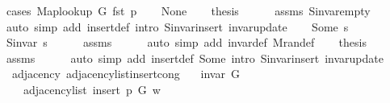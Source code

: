 \begin{isabellebody}
%
\isadelimproof
%
\endisadelimproof
%
\isatagproof
{}\isamarkupfalse%
\ {\isacharparenleft}{\kern0pt}cases\ {\isachardoublequoteopen}Map{\isacharunderscore}{\kern0pt}lookup\ G\ {\isacharparenleft}{\kern0pt}fst\ p{\isacharparenright}{\kern0pt}{\isachardoublequoteclose}{\isacharparenright}{\kern0pt}\isanewline
\ \ \isamarkupfalse%
\ None\isanewline
\ \ \isamarkupfalse%
\ {\isacharquery}{\kern0pt}thesis\isanewline
\ \ \ \ \isamarkupfalse%
\ assms\ S{\isachardot}{\kern0pt}invar{\isacharunderscore}{\kern0pt}empty\isanewline
\ \ \ \ \isamarkupfalse%
\ {\isacharparenleft}{\kern0pt}auto\ simp\ add{\isacharcolon}{\kern0pt}\ insert{\isacharunderscore}{\kern0pt}def\ intro{\isacharcolon}{\kern0pt}\ S{\isachardot}{\kern0pt}invar{\isacharunderscore}{\kern0pt}insert\ invar{\isacharunderscore}{\kern0pt}update{\isacharparenright}{\kern0pt}\isanewline
{}\isamarkupfalse%
\isanewline
\ \ \isamarkupfalse%
\ {\isacharparenleft}{\kern0pt}Some\ s{\isacharparenright}{\kern0pt}\isanewline
\ \ \isamarkupfalse%
\ {\isachardoublequoteopen}S{\isachardot}{\kern0pt}invar\ s{\isachardoublequoteclose}\isanewline
\ \ \ \ \isamarkupfalse%
\ assms\isanewline
\ \ \ \ \isamarkupfalse%
\ {\isacharparenleft}{\kern0pt}auto\ simp\ add{\isacharcolon}{\kern0pt}\ invar{\isacharunderscore}{\kern0pt}def\ M{\isachardot}{\kern0pt}ran{\isacharunderscore}{\kern0pt}def{\isacharparenright}{\kern0pt}\isanewline
\ \ \isamarkupfalse%
\ {\isacharquery}{\kern0pt}thesis\isanewline
\ \ \ \ \isamarkupfalse%
\ assms\isanewline
\ \ \ \ \isamarkupfalse%
\ {\isacharparenleft}{\kern0pt}auto\ simp\ add{\isacharcolon}{\kern0pt}\ insert{\isacharunderscore}{\kern0pt}def\ Some\ intro{\isacharcolon}{\kern0pt}\ S{\isachardot}{\kern0pt}invar{\isacharunderscore}{\kern0pt}insert\ invar{\isacharunderscore}{\kern0pt}update{\isacharparenright}{\kern0pt}\isanewline
{}\isamarkupfalse%
%
\endisatagproof
{\isafoldproof}%
%
\isadelimproof
\isanewline
%
\endisadelimproof
\isanewline
{}\isamarkupfalse%
\ {\isacharparenleft}{\kern0pt}\ adjacency{\isacharparenright}{\kern0pt}\ adjacency{\isacharunderscore}{\kern0pt}list{\isacharunderscore}{\kern0pt}insert{\isacharunderscore}{\kern0pt}cong{\isacharcolon}{\kern0pt}\isanewline
\ \ \ {\isachardoublequoteopen}invar\ G{\isachardoublequoteclose}\isanewline
\ \ \isanewline
\ \ \ \ {\isachardoublequoteopen}adjacency{\isacharunderscore}{\kern0pt}list\ {\isacharparenleft}{\kern0pt}insert\ p\ G{\isacharparenright}{\kern0pt}\ w\ {\isacharequal}{\kern0pt}\isanewline

\end{isabellebody}
